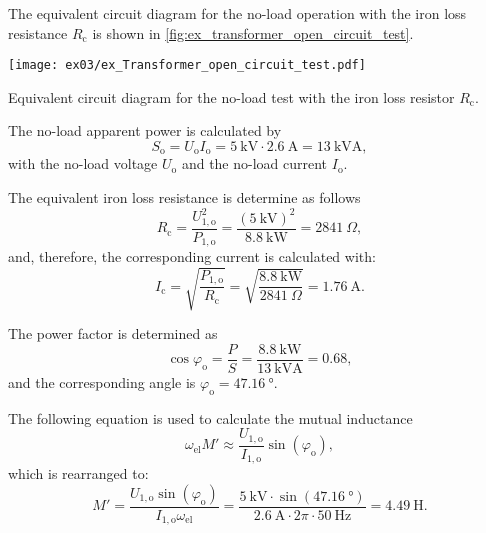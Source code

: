\begin{solutionblock}

  The equivalent circuit diagram for the no-load operation with the iron loss resistance $R_{\mathrm{c}}$ is shown in \autoref{fig:ex_transformer_open_circuit_test}.
  \begin{solutionfigure}[ht!]
    \centering
    \texttt{[image: ex03/ex\_Transformer\_open\_circuit\_test.pdf]}
    \caption{Equivalent circuit diagram for the no-load test with the iron loss resistor $R_{\mathrm{c}}$.}
    \label{fig:ex_transformer_open_circuit_test}
  \end{solutionfigure}
  
  
  The no-load apparent power is calculated by
  \begin{equation}
    S_{\mathrm{o}} = U_{\mathrm{o}} I_{\mathrm{o}}
    = \SI{5}{\kilo\volt} \cdot \SI{2.6}{\ampere}
    = \SI{13}{\kilo\volt\ampere},
  \end{equation}
  with the no-load voltage $U_{\mathrm{o}}$ and the no-load current $I_{\mathrm{o}}$.

  The equivalent iron loss resistance is determine as follows
  \begin{equation}
    R_{\mathrm{c}} = \frac{U_{\mathrm{1,o}}^2}{P_{\mathrm{1,o}}}
    = \frac{\left(\SI{5}{\kilo\volt} \right)^2}{\SI{8.8}{\kilo\watt}}
    = \SI{2841}{\Omega},
  \end{equation}
  and, therefore, the corresponding current is calculated with:
  \begin{equation}
    I_{\mathrm{c}} = \sqrt{\frac{P_{\mathrm{1,o}}}{R_{\mathrm{c}}}}
    = \sqrt{\frac{\SI{8.8}{\kilo\watt}}{\SI{2841}{\Omega}}}
    = \SI{1.76}{\ampere}.
  \end{equation}

  The power factor is determined as
  \begin{equation}
    \cos \varphi_{\mathrm{o}} = \frac{P}{S}
    = \frac{\SI{8.8}{\kilo\watt}}{\SI{13}{\kilo\volt\ampere}}
    = 0.68,
  \end{equation}
  and the corresponding angle is $\varphi_{\mathrm{o}} = \SI{47.16}{\degree}$.

  The following equation is used to calculate the mutual inductance
  \begin{equation}
    \omega_{\mathrm{el}} M' \approx \frac{U_{\mathrm{1,o}}}{I_{\mathrm{1,o}}}\sin(\varphi_{\mathrm{o}}),
  \end{equation}
  which is rearranged to:
  \begin{equation}
    M' = \frac{U_{\mathrm{1,o}}\sin(\varphi_{\mathrm{o}})}{I_{\mathrm{1,o}} \omega_{\mathrm{el}}}
    = \frac{\SI{5}{\kilo\volt}\cdot \sin(\SI{47.16}{\degree})}{\SI{2.6}{\ampere}\cdot 2\pi \cdot \SI{50}{\hertz}}
    = \SI{4.49}{\henry}.
  \end{equation}


\end{solutionblock}
